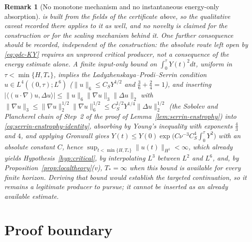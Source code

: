 \documentclass[11pt]{article}
\newtheorem{remark}[theorem]{Remark}
\theoremstyle{definition}
\theoremstyle{plain}
\newcommand{\norm}[1]{\lVert #1\rVert}
\begin{document}
\begin{remark}[No monotone mechanism and no instantaneous energy-only
absorption]
is built from the fields of the certificate above, so the qualitative caveat
recorded there applies to it as well, and no novelty is claimed for the
construction or for the scaling mechanism behind it.  One further
consequence should be recorded, independent of the construction: the
absolute route left open by \eqref{eq:qdc-KY} requires an unproved critical
producer, not a consequence of the energy estimate alone. A finite input-only
bound on $\int_0^\tau Y(t)^2dt$, uniform in $\tau<\min\{H,T_*\}$,
implies the Ladyzhenskaya--Prodi--Serrin condition $u\in L^4((0,\tau);L^6)$ ($\norm u_6\leq C_SY^{1/2}$ and
$\frac36+\frac24=1$), and inserting
$|\langle(u\cdot\nabla)u,\Delta u\rangle|\leq\norm u_6\norm{\nabla u}_3\norm{\Delta u}_2$
with
$\norm{\nabla u}_3\leq\norm{\nabla u}_2^{1/2}\norm{\nabla u}_6^{1/2}
\leq C_S^{1/2}Y^{1/4}\norm{\Delta u}_2^{1/2}$ (the Sobolev and Plancherel
chain of Step~2 of the proof of Lemma~\ref{lem:serrin-enstrophy}) into
\eqref{eq:serrin-enstrophy-identity}, absorbing by Young's inequality with
exponents $\frac43$ and $4$, and applying Gronwall gives
$Y(t)\leq Y(0)\exp\bigl(C\nu^{-3}C_S^4\int_0^\tau Y^2\bigr)$ with an
absolute constant $C$, hence
$\sup_{t<\min\{H,T_*\}}\norm{u(t)}_{H^1}<\infty$, which already yields
Hypothesis~\ref{hyp:critical}, by interpolating $L^3$ between $L^2$ and
$L^6$, and, by
Proposition~\ref{prop:localtheory}(v), $T_*=\infty$ when this bound is
available for every finite horizon. Deriving that bound would establish
the targeted continuation, so it remains a legitimate producer to pursue;
it cannot be inserted as an already available estimate.
\end{remark}

\section{Proof boundary}
\end{document}
